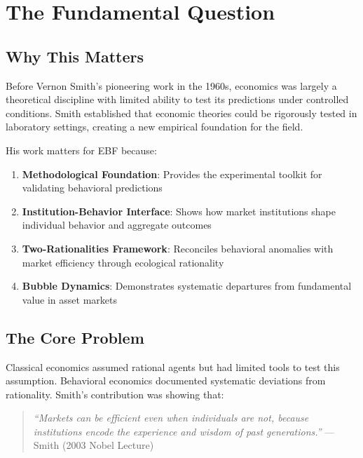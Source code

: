 \section{The Fundamental Question}
\label{sec:vs-fundamental}

\subsection{Why This Matters}

Before Vernon Smith's pioneering work in the 1960s, economics was largely a
theoretical discipline with limited ability to test its predictions under
controlled conditions. Smith established that economic theories could be
rigorously tested in laboratory settings, creating a new empirical foundation
for the field.

His work matters for EBF because:
\begin{enumerate}
\item \textbf{Methodological Foundation}: Provides the experimental toolkit for
      validating behavioral predictions
\item \textbf{Institution-Behavior Interface}: Shows how market institutions
      shape individual behavior and aggregate outcomes
\item \textbf{Two-Rationalities Framework}: Reconciles behavioral anomalies
      with market efficiency through ecological rationality
\item \textbf{Bubble Dynamics}: Demonstrates systematic departures from
      fundamental value in asset markets
\end{enumerate}

\subsection{The Core Problem}

Classical economics assumed rational agents but had limited tools to test this
assumption. Behavioral economics documented systematic deviations from rationality.
Smith's contribution was showing that:

\begin{quote}
\textit{``Markets can be efficient even when individuals are not, because
institutions encode the experience and wisdom of past generations.''}
--- Smith (2003 Nobel Lecture)
\end{quote}

